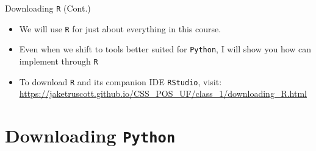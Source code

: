 \documentclass[
  ignorenonframetext,
]{beamer}
\providecommand{\tightlist}{%
  \setlength{\itemsep}{0pt}\setlength{\parskip}{0pt}}
\begin{document}
\begin{frame}{Downloading \texttt{R} (Cont.)}
\label{downloading-cont.}
\begin{itemize}
\tightlist
\item
  We will use \texttt{R} for just about everything in this course.

  \par \vspace{1.5mm}
\item
  Even when we shift to tools better suited for \texttt{Python}, I will
  show you how can implement through \texttt{R}

  \par \vspace{1.5mm}
\item
  To download \texttt{R} and its companion IDE \texttt{RStudio}, visit:
  \url{https://jaketruscott.github.io/CSS_POS_UF/class_1/downloading_R.html}

  \par \vspace{1.5mm}
\end{itemize}
\end{frame}

\section{\texorpdfstring{Downloading
\texttt{Python}}{Downloading }}\label{downloading-2}
\end{document}
